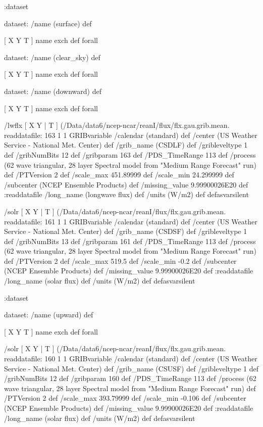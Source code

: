 \begin{ingrid}
 :dataset

 dataset: /name (surface) def

  [ X Y T ] { name exch def } forall

  dataset: /name (clear_sky) def

   [ X Y T ] { name exch def } forall

   dataset: /name (downward) def

    [ X Y T ] { name exch def } forall

    /lwflx { [ X Y | T ] (/Data/data6/ncep-ncar/reanI/flux/flx.gau.grib.mean.%
    readdatafile:
    163 1 1 GRIBvariable
    /calendar (standard) def
    /center (US Weather Service - National Met. Center) def
    /grib_name (CSDLF) def
    /gribleveltype 1 def
    /gribNumBits 12 def
    /gribparam 163 def
    /PDS_TimeRange 113 def
    /process (62 wave triangular, 28 layer Spectral model from "Medium Range Forecast" run) def
    /PTVersion 2 def
    /scale_max 451.89999 def
    /scale_min 24.299999 def
    /subcenter (NCEP Ensemble Products) def
    /missing_value 9.99900026E20 def
    :readdatafile
    /long_name (longwave flux) def
    /units (W/m2) def
    } defasvarsilent

    /solr { [ X Y | T ] (/Data/data6/ncep-ncar/reanI/flux/flx.gau.grib.mean.%
    readdatafile:
    161 1 1 GRIBvariable
    /calendar (standard) def
    /center (US Weather Service - National Met. Center) def
    /grib_name (CSDSF) def
    /gribleveltype 1 def
    /gribNumBits 13 def
    /gribparam 161 def
    /PDS_TimeRange 113 def
    /process (62 wave triangular, 28 layer Spectral model from "Medium Range Forecast" run) def
    /PTVersion 2 def
    /scale_max 519.5 def
    /scale_min -0.2 def
    /subcenter (NCEP Ensemble Products) def
    /missing_value 9.99900026E20 def
    :readdatafile
    /long_name (solar flux) def
    /units (W/m2) def
    } defasvarsilent

   :dataset

   dataset: /name (upward) def

    [ X Y T ] { name exch def } forall

    /solr { [ X Y | T ] (/Data/data6/ncep-ncar/reanI/flux/flx.gau.grib.mean.%
    readdatafile:
    160 1 1 GRIBvariable
    /calendar (standard) def
    /center (US Weather Service - National Met. Center) def
    /grib_name (CSUSF) def
    /gribleveltype 1 def
    /gribNumBits 12 def
    /gribparam 160 def
    /PDS_TimeRange 113 def
    /process (62 wave triangular, 28 layer Spectral model from "Medium Range Forecast" run) def
    /PTVersion 2 def
    /scale_max 393.79999 def
    /scale_min -0.106 def
    /subcenter (NCEP Ensemble Products) def
    /missing_value 9.99900026E20 def
    :readdatafile
    /long_name (solar flux) def
    /units (W/m2) def
    } defasvarsilent


\end{ingrid}
